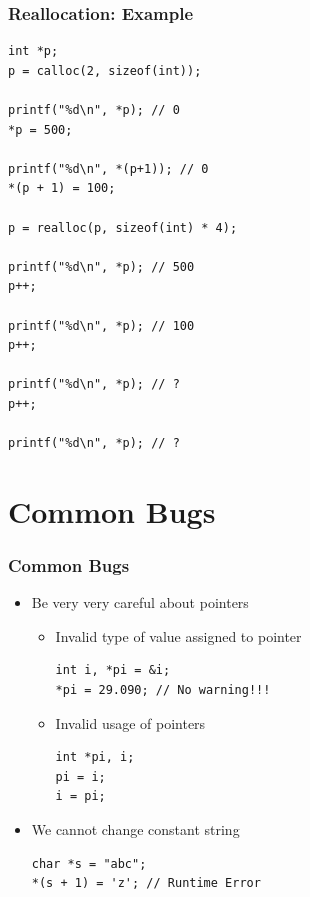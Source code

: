 \documentclass{../c-lecture}
\begin{document}
\begin{frame}[fragile]
  \frametitle{Reallocation: Example}
  \begin{verbatim}
int *p;
p = calloc(2, sizeof(int));

printf("%d\n", *p); // 0
*p = 500;

printf("%d\n", *(p+1)); // 0
*(p + 1) = 100;

p = realloc(p, sizeof(int) * 4);

printf("%d\n", *p); // 500
p++;

printf("%d\n", *p); // 100
p++;

printf("%d\n", *p); // ?
p++;

printf("%d\n", *p); // ?
  \end{verbatim}
\end{frame}

\section{Common Bugs}

\begin{frame}[fragile]
  \frametitle{Common Bugs}
  \begin{itemize}
    \item
      Be {\color{Orange} very very} careful about pointers
    \begin{itemize}
      \item Invalid type of value assigned to pointer
      \begin{verbatim}
int i, *pi = &i;
*pi = 29.090; // No warning!!!
      \end{verbatim}
      \item Invalid usage of pointers
      \begin{verbatim}
int *pi, i;
pi = i;
i = pi;
      \end{verbatim}
    \end{itemize}
  \end{itemize}
\end{frame}

\begin{frame}[fragile]
  \begin{itemize}
    \item We cannot change constant string
    \begin{verbatim}
char *s = "abc";
*(s + 1) = 'z'; // Runtime Error
    \end{verbatim}
  \end{itemize}
\end{frame}
\end{document}
